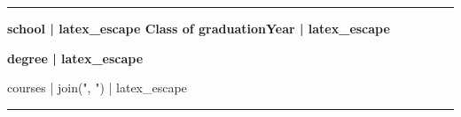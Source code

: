 \documentclass{article}
\begin{document}
\pagestyle{empty}


\vspace{-0.5\baselineskip} 
\noindent\rule{\linewidth}{0.4pt}
\vspace{-1.5\baselineskip} 


\textbf{ {{ school | latex_escape }} } \hfill \textbf{Class of {{ graduationYear | latex_escape }}}

{\bfseries\small {{ degree | latex_escape }}}

{{ courses | join(", ") | latex_escape }}

\vspace{-0.5\baselineskip} 
\noindent\rule{\linewidth}{0.4pt}
\vspace{-1.5\baselineskip}

\end{document}
